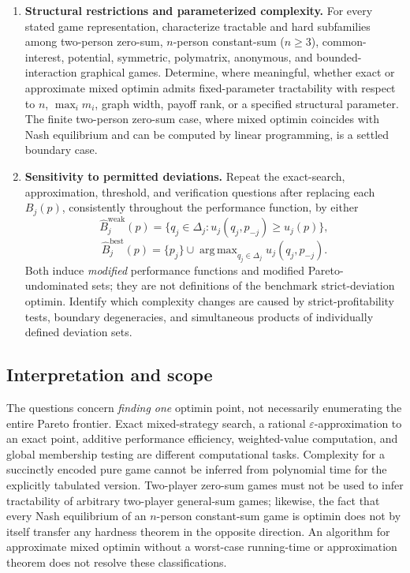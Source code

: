 \documentclass[11pt,a4paper]{article}
\DeclareMathOperator*{\argmax}{arg\,max}
\begin{document}
\begin{enumerate}[label=\textbf{(\Alph*)},leftmargin=2.7em]
\item \textbf{Structural restrictions and parameterized complexity.}
For every stated game representation, characterize tractable and hard subfamilies among two-person zero-sum, $n$-person constant-sum ($n\ge3$), common-interest, potential, symmetric, polymatrix, anonymous, and bounded-interaction graphical games. Determine, where meaningful, whether exact or approximate mixed optimin admits fixed-parameter tractability with respect to $n$, $\max_i m_i$, graph width, payoff rank, or a specified structural parameter. The finite two-person zero-sum case, where mixed optimin coincides with Nash equilibrium and can be computed by linear programming, is a settled boundary case.

\item \textbf{Sensitivity to permitted deviations.}
Repeat the exact-search, approximation, threshold, and verification questions after replacing each $B_j(p)$, consistently throughout the performance function, by either
\[
\widehat B_j^{\mathrm{weak}}(p)
=\{q_j\in\Delta_j:u_j(q_j,p_{-j})\ge u_j(p)\},
\]
\[
\widehat B_j^{\mathrm{best}}(p)
=\{p_j\}\cup\argmax_{q_j\in\Delta_j}u_j(q_j,p_{-j}).
\]
Both induce \emph{modified} performance functions and modified Pareto-undominated sets; they are not definitions of the benchmark strict-deviation optimin. Identify which complexity changes are caused by strict-profitability tests, boundary degeneracies, and simultaneous products of individually defined deviation sets.
\end{enumerate}

\subsection*{Interpretation and scope}

The questions concern \emph{finding one} optimin point, not necessarily enumerating the entire Pareto frontier. Exact mixed-strategy search, a rational $\varepsilon$-approximation to an exact point, additive performance efficiency, weighted-value computation, and global membership testing are different computational tasks. Complexity for a succinctly encoded pure game cannot be inferred from polynomial time for the explicitly tabulated version. Two-player zero-sum games must not be used to infer tractability of arbitrary two-player general-sum games; likewise, the fact that every Nash equilibrium of an $n$-person constant-sum game is optimin does not by itself transfer any hardness theorem in the opposite direction. An algorithm for approximate mixed optimin without a worst-case running-time or approximation theorem does not resolve these classifications.
\end{document}
